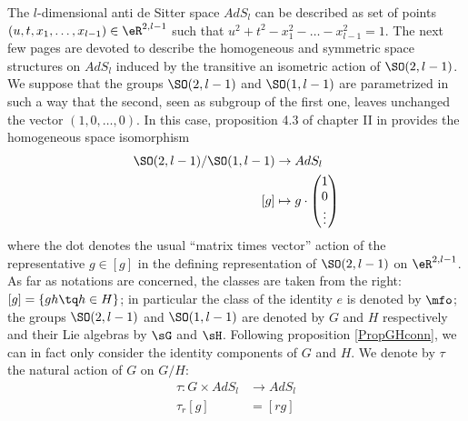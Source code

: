 The $l$-dimensional anti de Sitter space $AdS_l$ can be described as set of points $(u,t,x_1,\ldots,x_{l-1})\in \eR^{2,l-1}$  such that $u^2+t^2-x_1^2-\ldots-x_{l-1}^2=1$. The next few pages are devoted to describe the homogeneous and symmetric space structures on $AdS_l$ induced by the transitive an isometric action of $\SO(2,l-1)$. We suppose that the groups $\SO(2,l-1)$ and $\SO(1,l-1)$ are parametrized in such a way that the second, seen as subgroup of the first one, leaves unchanged the vector $(1,0,\ldots,0)$. In this case, proposition 4.3 of chapter II in \cite{Helgason} provides the homogeneous space isomorphism
\begin{equation}
\begin{aligned}
  \SO(2,l-1)/\SO(1,l-1)&\to AdS_l \\ 
[g]&\mapsto  
 g\cdot
\begin{pmatrix}
1\\0\\\vdots
\end{pmatrix}
\end{aligned}
\end{equation}
where the dot denotes the usual ``matrix times vector'' action of the representative $g\in [g]$ in the defining representation of $\SO(2,l-1)$ on $\eR^{2,l-1}$. As far as notations are concerned, the classes are taken from the right:  $[g]=\{gh\tq h\in H\}$; in particular the class of the identity $e$ is denoted by $\mfo$; the groups $\SO(2,l-1)$ and $\SO(1,l-1)$ are denoted by $G$ and $H$ respectively and their Lie algebras by $\sG$ and $\sH$. Following proposition \ref{PropGHconn}, we can in fact only consider the identity components of $G$ and $H$. We denote by $\tau$ the natural action of $G$ on $G/H$:
\begin{equation}
\begin{aligned}
 \tau\colon G\times AdS_l&\to AdS_l \\ 
   \tau_r[g]&= [rg] 
\end{aligned}
\end{equation}


